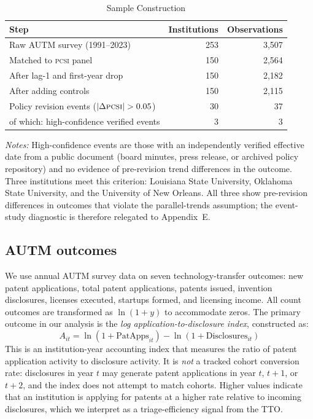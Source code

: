 \documentclass[12pt]{article}
\newcommand{\PCSI}{\textsc{pcsi}}
\begin{document}
\begin{table}[htbp]
\centering
\caption{Sample Construction}
\label{tab:sampleflow}
\begin{threeparttable}
\begin{tabular}{lrr}
\toprule
Step & Institutions & Observations \\
\midrule
Raw AUTM survey (1991--2023) & 253 & 3,507 \\
Matched to \PCSI{} panel & 150 & 2,564 \\
After lag-1 and first-year drop & 150 & 2,182 \\
After adding controls & 150 & 2,115 \\
\midrule
Policy revision events ($|\Delta\PCSI{}|>0.05$) & 30 & 37 \\
\quad of which: high-confidence verified events & 3 & 3 \\
\bottomrule
\end{tabular}
\begin{tablenotes}
\small
\item \textit{Notes:} High-confidence events are those with an independently verified
effective date from a public document (board minutes, press release, or archived policy
repository) and no evidence of pre-revision trend differences in the outcome. Three
institutions meet this criterion: Louisiana State University, Oklahoma State University,
and the University of New Orleans. All three show pre-revision differences in outcomes
that violate the parallel-trends assumption; the event-study diagnostic is therefore
relegated to Appendix~E.
\end{tablenotes}
\end{threeparttable}
\end{table}

\subsection{AUTM outcomes}

We use annual AUTM survey data on seven technology-transfer outcomes: new patent
applications, total patent applications, patents issued, invention disclosures, licenses
executed, startups formed, and licensing income. All count outcomes are transformed as
$\ln(1 + y)$ to accommodate zeros. The primary outcome in our analysis is the
\textit{log application-to-disclosure index}, constructed as:
\begin{equation}
  A_{it} = \ln(1 + \text{PatApps}_{it}) - \ln(1 + \text{Disclosures}_{it})
  \label{eq:convrate}
\end{equation}
This is an institution-year accounting index that measures the ratio of patent
application activity to disclosure activity. It is \emph{not} a tracked cohort
conversion rate: disclosures in year $t$ may generate patent applications in year
$t$, $t+1$, or $t+2$, and the index does not attempt to match cohorts. Higher values
indicate that an institution is applying for patents at a higher rate relative to
incoming disclosures, which we interpret as a triage-efficiency signal from the TTO.
\end{document}
